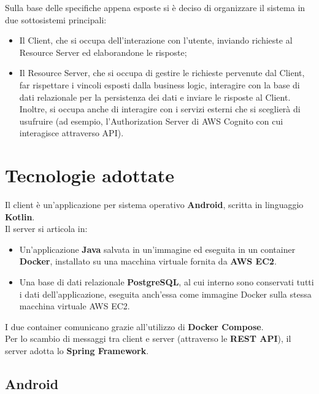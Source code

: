         Sulla base delle specifiche appena esposte si è deciso di organizzare il sistema in due sottosistemi principali:
        \begin{itemize}
            \item Il Client, che si occupa dell'interazione con l'utente, inviando richieste al Resource Server ed elaborandone le risposte;
            \item Il Resource Server, che si occupa di gestire le richieste pervenute dal Client, far rispettare i vincoli esposti dalla business logic, interagire con la base di dati relazionale per la persistenza dei dati e inviare le risposte al Client. Inoltre, si occupa anche di interagire con i servizi esterni che si sceglierà di usufruire (ad esempio, l'Authorization Server di AWS Cognito con cui interagisce attraverso API).
        \end{itemize}
        

    \clearpage

    \section{Tecnologie adottate}
        Il client è un'applicazione per sistema operativo \textbf{Android}, scritta in linguaggio \textbf{Kotlin}. \\
        Il server si articola in:
        \begin{itemize}
            \item Un'applicazione \textbf{Java} salvata in un'immagine ed eseguita in un container \textbf{Docker}, installato su una macchina virtuale fornita da \textbf{AWS EC2}.
            \item Una base di dati relazionale \textbf{PostgreSQL}, al cui interno sono conservati tutti i dati dell'applicazione, eseguita anch'essa come immagine Docker sulla stessa macchina virtuale AWS EC2.
        \end{itemize}
        I due container comunicano grazie all'utilizzo di \textbf{Docker Compose}. \\
        Per lo scambio di messaggi tra client e server (attraverso le \textbf{REST API}), il server adotta lo \textbf{Spring Framework}. \\

        \subsection{Android}

